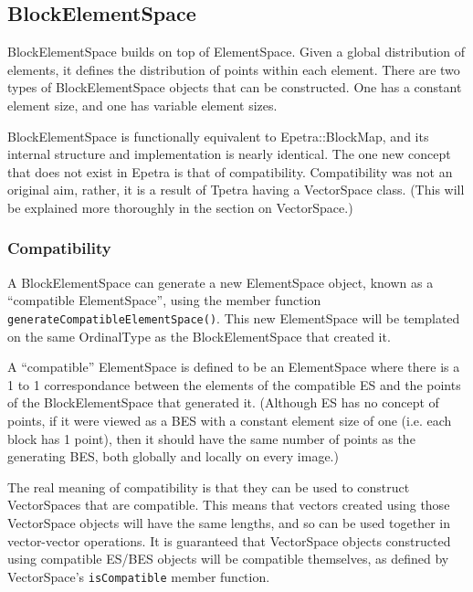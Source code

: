 \documentclass[10pt,relax]{TpetraDesign}
\begin{document}
%
\subsection{BlockElementSpace}
BlockElementSpace builds on top of ElementSpace. Given a global distribution of elements, it defines the distribution of points within each element. There are two types of BlockElementSpace objects that can be constructed. One has a constant element size, and one has variable element sizes.

BlockElementSpace is functionally equivalent to Epetra::BlockMap, and its internal structure and implementation is nearly identical. The one new concept that does not exist in Epetra is that of compatibility. Compatibility was not an original aim, rather, it is a result of Tpetra having a VectorSpace class. (This will be explained more thoroughly in the section on VectorSpace.)

\subsubsection*{Compatibility}
A BlockElementSpace can generate a new ElementSpace object, known as a ``compatible ElementSpace'', using the member function \texttt{generateCompatibleElementSpace()}. This new ElementSpace will be templated on the same OrdinalType as the BlockElementSpace that created it.

A ``compatible'' ElementSpace is defined to be an ElementSpace where there is a 1 to 1 correspondance between the elements of the compatible ES and the points of the BlockElementSpace that generated it. (Although ES has no concept of points, if it were viewed as a BES with a constant element size of one (i.e. each block has 1 point), then it should have the same number of points as the generating BES, both globally and locally on every image.)

The real meaning of compatibility is that they can be used to construct VectorSpaces that are compatible. This means that vectors created using those VectorSpace objects will have the same lengths, and so can be used together in vector-vector operations. It is guaranteed that VectorSpace objects constructed using compatible ES/BES objects will be compatible themselves, as defined by VectorSpace's \texttt{isCompatible} member function.

\end{document}
